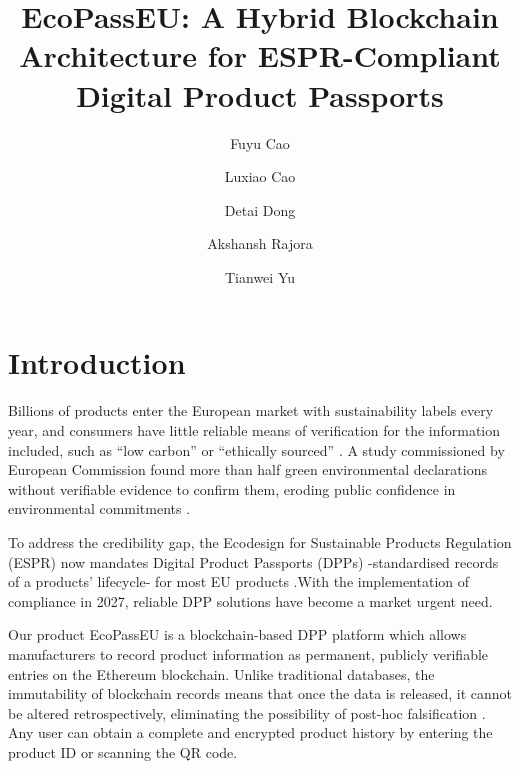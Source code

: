 \documentclass[runningheads]{llncs}
\begin{document}
	\title{EcoPassEU: A Hybrid Blockchain Architecture for ESPR-Compliant Digital Product Passports}
	
	
	\author{Fuyu Cao \and
		Luxiao Cao \and
		Detai Dong \and
		Akshansh Rajora \and
		Tianwei Yu}
	
	
	\maketitle              %

	\section{Introduction}
	Billions of products enter the European market with sustainability labels every year, and consumers have little reliable means of verification for the information included, such as ``low carbon'' or ``ethically sourced'' \cite{Silva2021The}.
	A study commissioned by European Commission found more than half green environmental declarations without verifiable evidence to confirm them, eroding public confidence in environmental commitments \cite{Silva2021The}.
	
	To address the credibility gap, the Ecodesign for Sustainable Products Regulation (ESPR) now mandates Digital Product Passports (DPPs) -standardised records of a products' lifecycle- for most EU products \cite{circularise_dpp_2025}.With the implementation of compliance in 2027, reliable DPP solutions have become a market urgent need.
	
	Our product EcoPassEU is a blockchain-based DPP platform which  allows manufacturers to record product information as permanent, publicly verifiable entries on the Ethereum blockchain. 
	Unlike traditional databases, the immutability of blockchain records means that once the data is released, it cannot be altered retrospectively, eliminating the possibility of post-hoc falsification \cite{Casino2019Systematic}. 
	Any user can obtain a complete and encrypted product history by entering the product ID or scanning the QR code.
	
\end{document}
